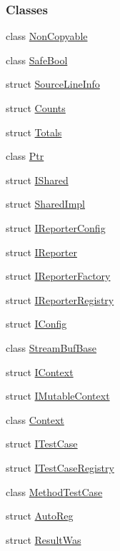 \subsubsection*{Classes}
\begin{DoxyCompactItemize}
\item 
class \hyperlink{classCatch_1_1NonCopyable}{Non\-Copyable}
\item 
class \hyperlink{classCatch_1_1SafeBool}{Safe\-Bool}
\item 
struct \hyperlink{structCatch_1_1SourceLineInfo}{Source\-Line\-Info}
\item 
struct \hyperlink{structCatch_1_1Counts}{Counts}
\item 
struct \hyperlink{structCatch_1_1Totals}{Totals}
\item 
class \hyperlink{classCatch_1_1Ptr}{Ptr}
\item 
struct \hyperlink{structCatch_1_1IShared}{I\-Shared}
\item 
struct \hyperlink{structCatch_1_1SharedImpl}{Shared\-Impl}
\item 
struct \hyperlink{structCatch_1_1IReporterConfig}{I\-Reporter\-Config}
\item 
struct \hyperlink{structCatch_1_1IReporter}{I\-Reporter}
\item 
struct \hyperlink{structCatch_1_1IReporterFactory}{I\-Reporter\-Factory}
\item 
struct \hyperlink{structCatch_1_1IReporterRegistry}{I\-Reporter\-Registry}
\item 
struct \hyperlink{structCatch_1_1IConfig}{I\-Config}
\item 
class \hyperlink{classCatch_1_1StreamBufBase}{Stream\-Buf\-Base}
\item 
struct \hyperlink{structCatch_1_1IContext}{I\-Context}
\item 
struct \hyperlink{structCatch_1_1IMutableContext}{I\-Mutable\-Context}
\item 
class \hyperlink{classCatch_1_1Context}{Context}
\item 
struct \hyperlink{structCatch_1_1ITestCase}{I\-Test\-Case}
\item 
struct \hyperlink{structCatch_1_1ITestCaseRegistry}{I\-Test\-Case\-Registry}
\item 
class \hyperlink{classCatch_1_1MethodTestCase}{Method\-Test\-Case}
\item 
struct \hyperlink{structCatch_1_1AutoReg}{Auto\-Reg}
\item 
struct \hyperlink{structCatch_1_1ResultWas}{Result\-Was}

\end{DoxyCompactItemize}
